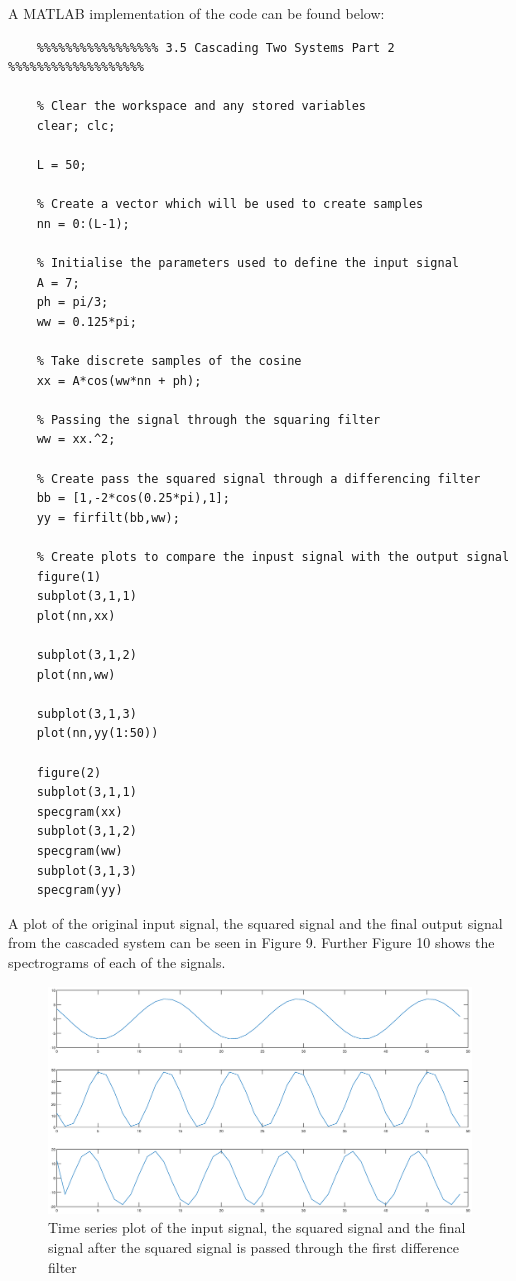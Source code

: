 \documentclass{article}
\begin{document}
A MATLAB implementation of the code can be found below:
\begin{lstlisting}
	%%%%%%%%%%%%%%%%% 3.5 Cascading Two Systems Part 2 %%%%%%%%%%%%%%%%%%%
	
	% Clear the workspace and any stored variables
	clear; clc;
	
	L = 50;
	
	% Create a vector which will be used to create samples
	nn = 0:(L-1);
	
	% Initialise the parameters used to define the input signal
	A = 7;
	ph = pi/3;
	ww = 0.125*pi;
	
	% Take discrete samples of the cosine
	xx = A*cos(ww*nn + ph);
	
	% Passing the signal through the squaring filter
	ww = xx.^2;
	
	% Create pass the squared signal through a differencing filter
	bb = [1,-2*cos(0.25*pi),1];
	yy = firfilt(bb,ww);
	
	% Create plots to compare the inpust signal with the output signal
	figure(1)
	subplot(3,1,1)
	plot(nn,xx)
	
	subplot(3,1,2)
	plot(nn,ww)
	
	subplot(3,1,3)
	plot(nn,yy(1:50))
	
	figure(2)
	subplot(3,1,1)
	specgram(xx)
	subplot(3,1,2)
	specgram(ww)
	subplot(3,1,3)
	specgram(yy)
\end{lstlisting}

A plot of the original input signal, the squared signal and the final output signal from the cascaded system can be seen in Figure 9. Further Figure 10 shows the spectrograms of each of the signals.

\begin{figure}[H]
	\centering
	\includegraphics[scale=0.25]{fig9}
	\caption{Time series plot of the input signal, the squared signal and the final signal after the squared signal is passed through the first difference filter}
\end{figure}
\end{document}
